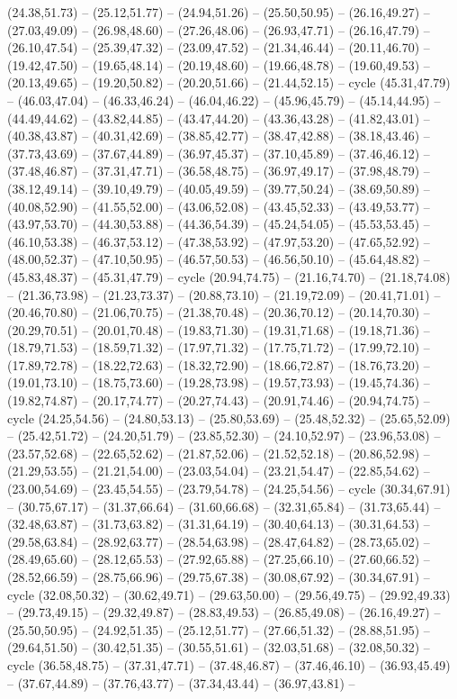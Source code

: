 {(24.38,51.73) -- (25.12,51.77) -- (24.94,51.26) -- (25.50,50.95) -- (26.16,49.27) -- (27.03,49.09) -- (26.98,48.60) -- (27.26,48.06) -- (26.93,47.71) -- (26.16,47.79) -- (26.10,47.54) -- (25.39,47.32) -- (23.09,47.52) -- (21.34,46.44) -- (20.11,46.70) -- (19.42,47.50) -- (19.65,48.14) -- (20.19,48.60) -- (19.66,48.78) -- (19.60,49.53) -- (20.13,49.65) -- (19.20,50.82) -- (20.20,51.66) -- (21.44,52.15) -- cycle (45.31,47.79) -- (46.03,47.04) -- (46.33,46.24) -- (46.04,46.22) -- (45.96,45.79) -- (45.14,44.95) -- (44.49,44.62) -- (43.82,44.85) -- (43.47,44.20) -- (43.36,43.28) -- (41.82,43.01) -- (40.38,43.87) -- (40.31,42.69) -- (38.85,42.77) -- (38.47,42.88) -- (38.18,43.46) -- (37.73,43.69) -- (37.67,44.89) -- (36.97,45.37) -- (37.10,45.89) -- (37.46,46.12) -- (37.48,46.87) -- (37.31,47.71) -- (36.58,48.75) -- (36.97,49.17) -- (37.98,48.79) -- (38.12,49.14) -- (39.10,49.79) -- (40.05,49.59) -- (39.77,50.24) -- (38.69,50.89) -- (40.08,52.90) -- (41.55,52.00) -- (43.06,52.08) -- (43.45,52.33) -- (43.49,53.77) -- (43.97,53.70) -- (44.30,53.88) -- (44.36,54.39) -- (45.24,54.05) -- (45.53,53.45) -- (46.10,53.38) -- (46.37,53.12) -- (47.38,53.92) -- (47.97,53.20) -- (47.65,52.92) -- (48.00,52.37) -- (47.10,50.95) -- (46.57,50.53) -- (46.56,50.10) -- (45.64,48.82) -- (45.83,48.37) -- (45.31,47.79) -- cycle (20.94,74.75) -- (21.16,74.70) -- (21.18,74.08) -- (21.36,73.98) -- (21.23,73.37) -- (20.88,73.10) -- (21.19,72.09) -- (20.41,71.01) -- (20.46,70.80) -- (21.06,70.75) -- (21.38,70.48) -- (20.36,70.12) -- (20.14,70.30) -- (20.29,70.51) -- (20.01,70.48) -- (19.83,71.30) -- (19.31,71.68) -- (19.18,71.36) -- (18.79,71.53) -- (18.59,71.32) -- (17.97,71.32) -- (17.75,71.72) -- (17.99,72.10) -- (17.89,72.78) -- (18.22,72.63) -- (18.32,72.90) -- (18.66,72.87) -- (18.76,73.20) -- (19.01,73.10) -- (18.75,73.60) -- (19.28,73.98) -- (19.57,73.93) -- (19.45,74.36) -- (19.82,74.87) -- (20.17,74.77) -- (20.27,74.43) -- (20.91,74.46) -- (20.94,74.75) -- cycle (24.25,54.56) -- (24.80,53.13) -- (25.80,53.69) -- (25.48,52.32) -- (25.65,52.09) -- (25.42,51.72) -- (24.20,51.79) -- (23.85,52.30) -- (24.10,52.97) -- (23.96,53.08) -- (23.57,52.68) -- (22.65,52.62) -- (21.87,52.06) -- (21.52,52.18) -- (20.86,52.98) -- (21.29,53.55) -- (21.21,54.00) -- (23.03,54.04) -- (23.21,54.47) -- (22.85,54.62) -- (23.00,54.69) -- (23.45,54.55) -- (23.79,54.78) -- (24.25,54.56) -- cycle (30.34,67.91) -- (30.75,67.17) -- (31.37,66.64) -- (31.60,66.68) -- (32.31,65.84) -- (31.73,65.44) -- (32.48,63.87) -- (31.73,63.82) -- (31.31,64.19) -- (30.40,64.13) -- (30.31,64.53) -- (29.58,63.84) -- (28.92,63.77) -- (28.54,63.98) -- (28.47,64.82) -- (28.73,65.02) -- (28.49,65.60) -- (28.12,65.53) -- (27.92,65.88) -- (27.25,66.10) -- (27.60,66.52) -- (28.52,66.59) -- (28.75,66.96) -- (29.75,67.38) -- (30.08,67.92) -- (30.34,67.91) -- cycle (32.08,50.32) -- (30.62,49.71) -- (29.63,50.00) -- (29.56,49.75) -- (29.92,49.33) -- (29.73,49.15) -- (29.32,49.87) -- (28.83,49.53) -- (26.85,49.08) -- (26.16,49.27) -- (25.50,50.95) -- (24.92,51.35) -- (25.12,51.77) -- (27.66,51.32) -- (28.88,51.95) -- (29.64,51.50) -- (30.42,51.35) -- (30.55,51.61) -- (32.03,51.68) -- (32.08,50.32) -- cycle (36.58,48.75) -- (37.31,47.71) -- (37.48,46.87) -- (37.46,46.10) -- (36.93,45.49) -- (37.67,44.89) -- (37.76,43.77) -- (37.34,43.44) -- (36.97,43.81) -- }
